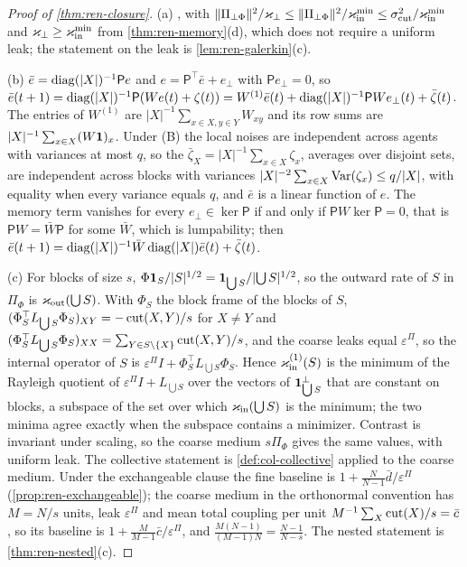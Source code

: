 \begin{proof}[Proof of \cref{thm:ren-closure}]
(a) , with $\Vert\Pi_{\perp\Phi}\Vert^2/\varkappa_\perp\le\Vert\Pi_{\perp\Phi}\Vert^2/\varkappa_{\mathrm{in}}^{\min}\le\sigma^2_{\mathrm{cut}}/\varkappa_{\mathrm{in}}^{\min}$ and $\varkappa_\perp\ge\varkappa_{\mathrm{in}}^{\min}$ from \cref{thm:ren-memory}(d), which does not require a uniform leak; the statement on the leak is \cref{lem:ren-galerkin}(c).

(b) $\bar e=\operatorname{diag}(\lvert X\rvert)^{-1}\mathsf Pe$ and $e=\mathsf P^\top\bar e+e_\perp$ with $\mathsf Pe_\perp=0$, so $\bar e(t+1)=\operatorname{diag}(\lvert X\rvert)^{-1}\mathsf P(We(t)+\zeta(t))=W^{(1)}\bar e(t)+\operatorname{diag}(\lvert X\rvert)^{-1}\mathsf PWe_\perp(t)+\bar\zeta(t)$. The entries of $W^{(1)}$ are $\lvert X\rvert^{-1}\sum_{x\in X,y\in Y}W_{xy}$ and its row sums are $\lvert X\rvert^{-1}\sum_{x\in X}(W\mathbf{1})_x$. Under \textup{(B)} the local noises are independent across agents with variances at most $q$, so the $\bar\zeta_X=\lvert X\rvert^{-1}\sum_{x\in X}\zeta_x$, averages over disjoint sets, are independent across blocks with variances $\lvert X\rvert^{-2}\sum_{x\in X}\operatorname{Var}(\zeta_x)\le q/\lvert X\rvert$, with equality when every variance equals $q$, and $\bar e$ is a linear function of $e$. The memory term vanishes for every $e_\perp\in\ker\mathsf P$ if and only if $\mathsf PW\ker\mathsf P=0$, that is $\mathsf PW=\bar W\mathsf P$ for some $\bar W$, which is lumpability; then $\bar e(t+1)=\operatorname{diag}(\lvert X\rvert)^{-1}\bar W\operatorname{diag}(\lvert X\rvert)\bar e(t)+\bar\zeta(t)$.

(c) For blocks of size $s$, $\Phi\mathbf{1}_S/\lvert S\rvert^{1/2}=\mathbf{1}_{\bigcup S}/\lvert\bigcup S\rvert^{1/2}$, so the outward rate of $S$ in $\Pi_\Phi$ is $\varkappa_{\mathrm{out}}(\bigcup S)$. With $\Phi_S$ the block frame of the blocks of $S$, $(\Phi_S^\top L_{\bigcup S}\Phi_S)_{XY}=-\operatorname{cut}(X,Y)/s$ for $X\neq Y$ and $(\Phi_S^\top L_{\bigcup S}\Phi_S)_{XX}=\sum_{Y\in S\setminus\{X\}}\operatorname{cut}(X,Y)/s$, and the coarse leaks equal $\varepsilon^\Pi$, so the internal operator of $S$ is $\varepsilon^\Pi I+\Phi_S^\top L_{\bigcup S}\Phi_S$. Hence $\varkappa_{\mathrm{in}}^{(1)}(S)$ is the minimum of the Rayleigh quotient of $\varepsilon^\Pi I+L_{\bigcup S}$ over the vectors of $\mathbf{1}_{\bigcup S}^\perp$ that are constant on blocks, a subspace of the set over which $\varkappa_{\mathrm{in}}(\bigcup S)$ is the minimum; the two minima agree exactly when the subspace contains a minimizer. Contrast is invariant under scaling, so the coarse medium $s\Pi_\Phi$ gives the same values, with uniform leak. The collective statement is \cref{def:col-collective} applied to the coarse medium. Under the exchangeable clause the fine baseline is $1+\frac N{N-1}\bar d/\varepsilon^\Pi$ (\cref{prop:ren-exchangeable}); the coarse medium in the orthonormal convention has $M=N/s$ units, leak $\varepsilon^\Pi$ and mean total coupling per unit $M^{-1}\sum_X\operatorname{cut}(X)/s=\bar c$, so its baseline is $1+\frac M{M-1}\bar c/\varepsilon^\Pi$, and $\frac{M(N-1)}{(M-1)N}=\frac{N-1}{N-s}$. The nested statement is \cref{thm:ren-nested}(c).


\end{proof}
